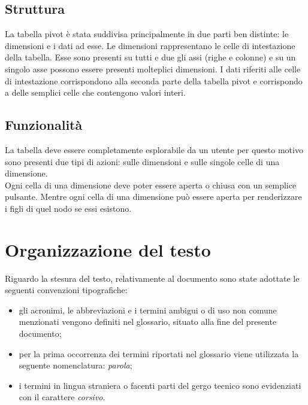 \subsection{Struttura}
La tabella pivot è stata suddivisa principalmente in due parti ben distinte: le dimensioni e i dati ad esse. Le dimensioni rappresentano le celle di intestazione della tabella. Esse sono presenti su tutti e due gli assi (righe e colonne) e su un singolo asse possono essere presenti molteplici dimensioni. I dati riferiti alle celle di intestazione corrispondono alla seconda parte della tabella pivot e corrispondo a delle semplici celle che contengono valori interi.

\subsection{Funzionalità}
La tabella deve essere completamente esplorabile da un utente per questo motivo sono presenti due tipi di azioni: sulle dimensioni e sulle singole celle di una dimensione. \\
Ogni cella di una dimensione deve poter essere aperta o chiusa con un semplice pulsante. Mentre ogni cella di una dimensione può essere aperta per renderizzare i figli di quel nodo se essi esistono. 

\section{Organizzazione del testo}
Riguardo la stesura del testo, relativamente al documento sono state adottate le seguenti convenzioni tipografiche:
\begin{itemize}
	\item gli acronimi, le abbreviazioni e i termini ambigui o di uso non comune menzionati vengono definiti nel glossario, situato alla fine del presente documento;
	\item per la prima occorrenza dei termini riportati nel glossario viene utilizzata la seguente nomenclatura: \emph{parola}\glo;
	\item i termini in lingua straniera o facenti parti del gergo tecnico sono evidenziati con il carattere \emph{corsivo}.
\end{itemize}